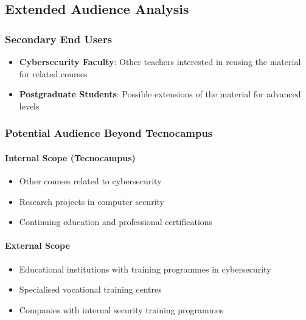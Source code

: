 \subsection{Extended Audience Analysis}

\subsubsection{Secondary End Users}

\begin{itemize}
\tightlist
\item
  \textbf{Cybersecurity Faculty}: Other teachers interested in reusing the material for related courses
\item
  \textbf{Postgraduate Students}: Possible extensions of the material for advanced levels
\end{itemize}

\subsubsection{Potential Audience Beyond Tecnocampus}

\paragraph{Internal Scope (Tecnocampus)}

\begin{itemize}
\tightlist
\item
  Other courses related to cybersecurity
\item
  Research projects in computer security
\item
  Continuing education and professional certifications
\end{itemize}

\paragraph{External Scope}

\begin{itemize}
\tightlist
\item
  Educational institutions with training programmes in cybersecurity
\item
  Specialised vocational training centres
\item
  Companies with internal security training programmes
\end{itemize}
